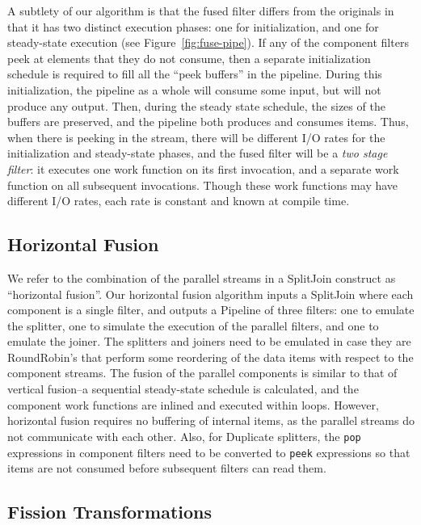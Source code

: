 A subtlety of our algorithm is that the fused filter differs from the
originals in that it has two distinct execution phases: one for
initialization, and one for steady-state execution (see
Figure~\ref{fig:fuse-pipe}).  If any of the component filters peek at
elements that they do not consume, then a separate initialization
schedule is required to fill all the ``peek buffers'' in the pipeline.
During this initialization, the pipeline as a whole will consume some
input, but will not produce any output.  Then, during the steady state
schedule, the sizes of the buffers are preserved, and the pipeline
both produces and consumes items.  Thus, when there is peeking in the
stream, there will be different I/O rates for the initialization and
steady-state phases, and the fused filter will be a {\it two stage
filter}: it executes one work function on its first invocation, and a
separate work function on all subsequent invocations.  Though these
work functions may have different I/O rates, each rate is constant and
known at compile time.

\subsection{Horizontal Fusion}

We refer to the combination of the parallel streams in a SplitJoin
construct as ``horizontal fusion''.  Our horizontal fusion algorithm
inputs a SplitJoin where each component is a single filter, and
outputs a Pipeline of three filters: one to emulate the splitter, one
to simulate the execution of the parallel filters, and one to emulate
the joiner.  The splitters and joiners need to be emulated in case
they are RoundRobin's that perform some reordering of the data items
with respect to the component streams.  The fusion of the parallel
components is similar to that of vertical fusion--a sequential
steady-state schedule is calculated, and the component work functions
are inlined and executed within loops.  However, horizontal fusion
requires no buffering of internal items, as the parallel streams do
not communicate with each other.  Also, for Duplicate splitters, the
{\tt pop} expressions in component filters need to be converted to
{\tt peek} expressions so that items are not consumed before
subsequent filters can read them.

\subsection{Fission Transformations}

